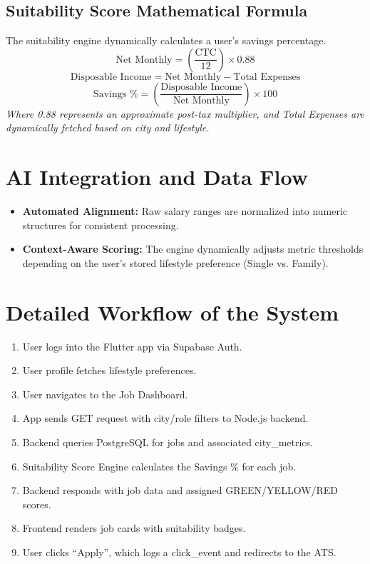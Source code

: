 \subsection{Suitability Score Mathematical Formula}
The suitability engine dynamically calculates a user's savings percentage.
\begin{equation}
    \text{Net Monthly} = \left(\frac{\text{CTC}}{12}\right) \times 0.88
\end{equation}
\begin{equation}
    \text{Disposable Income} = \text{Net Monthly} - \text{Total Expenses}
\end{equation}
\begin{equation}
    \text{Savings } \% = \left(\frac{\text{Disposable Income}}{\text{Net Monthly}}\right) \times 100
\end{equation}
\textit{Where 0.88 represents an approximate post-tax multiplier, and Total Expenses are dynamically fetched based on city and lifestyle.}

\section{AI Integration and Data Flow}
\begin{itemize}
    \item \textbf{Automated Alignment:} Raw salary ranges are normalized into numeric structures for consistent processing.
    \item \textbf{Context-Aware Scoring:} The engine dynamically adjusts metric thresholds depending on the user's stored lifestyle preference (Single vs. Family).
\end{itemize}

\section{Detailed Workflow of the System}
\begin{enumerate}
    \item User logs into the Flutter app via Supabase Auth.
    \item User profile fetches lifestyle preferences.
    \item User navigates to the Job Dashboard.
    \item App sends GET request with city/role filters to Node.js backend.
    \item Backend queries PostgreSQL for jobs and associated city\_metrics.
    \item Suitability Score Engine calculates the Savings \% for each job.
    \item Backend responds with job data and assigned GREEN/YELLOW/RED scores.
    \item Frontend renders job cards with suitability badges.
    \item User clicks ``Apply'', which logs a click\_event and redirects to the ATS.
\end{enumerate}
